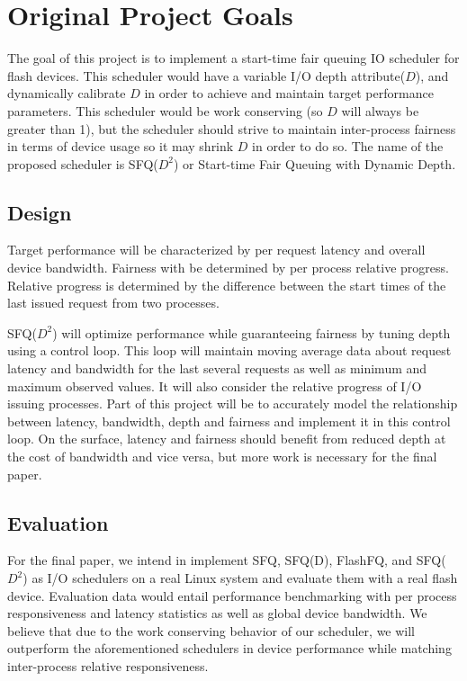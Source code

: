 \section{Original Project Goals}

The goal of this project is to implement a start-time fair queuing IO
scheduler for flash devices. This scheduler would have a variable I/O
depth attribute($D$), and dynamically calibrate $D$ in order to
achieve and maintain target performance parameters. This scheduler
would be work conserving (so $D$ will always be greater than 1), but the
scheduler should strive to maintain inter-process fairness in terms of
device usage so it may shrink $D$ in order to do so. The name of the
proposed scheduler is SFQ($D^2$) or Start-time Fair Queuing with
Dynamic Depth.

\subsection{Design}

Target performance will be characterized by per request latency and
overall device bandwidth. Fairness with be determined by per process
relative progress. Relative progress is determined by the difference
between the start times of the last issued request from two processes.

SFQ($D^2$) will optimize performance while guaranteeing fairness by
tuning depth using a control loop. This loop will maintain moving
average data about request latency and bandwidth for the last several
requests as well as minimum and maximum observed values. It will also
consider the relative progress of I/O issuing processes. Part of this
project will be to accurately model the relationship between latency,
bandwidth, depth and fairness and implement it in this control
loop. On the surface, latency and fairness should benefit from reduced
depth at the cost of bandwidth and vice versa, but more work is
necessary for the final paper.

\subsection{Evaluation}

For the final paper, we intend in implement SFQ, SFQ(D), FlashFQ, and
SFQ($D^2$) as I/O schedulers on a real Linux system and evaluate them
with a real flash device. Evaluation data would entail performance
benchmarking with per process responsiveness and latency statistics as
well as global device bandwidth. We believe that due to the work
conserving behavior of our scheduler, we will outperform the
aforementioned schedulers in device performance while matching
inter-process relative responsiveness.
